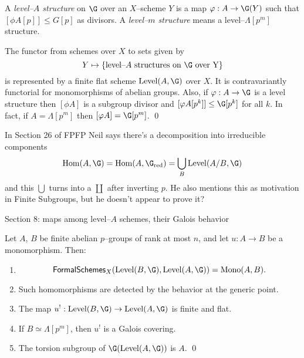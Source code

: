 \begin{definition}
A \textit{level--$A$ structure} on $\G$ over an $X$--scheme $Y$ is a map $\phi: A \to \G(Y)$ such that $[\phi A[p]] \le G[p]$ as divisors.  A \textit{level--$m$ structure} means a level--$\Lambda[p^m]$ structure.
\end{definition}

\begin{lemma}
The functor from schemes over $X$ to sets given by \[Y \mapsto \{\text{level--$A$ structures on $\G$ over Y}\}\] is represented by a finite flat scheme $\Level(A, \G)$ over $X$.  It is contravariantly functorial for monomorphisms of abelian groups.  Also, if $\phi: A \to \G$ is a level structure then $[\phi A]$ is a subgroup divisor and $[\phi A[p^k]] \le \G[p^k]$ for all $k$.  In fact, if $A = \Lambda[p^m]$ then $[\phi A] = \G[p^m]$.  \qed  {}
\end{lemma}

In Section 26 of FPFP Neil says there's a decomposition into irreducible components \[\operatorname{Hom}(A, \G) = \operatorname{Hom}(A, \G_{\mathrm{red}}) = \bigcup_B \Level(A/B, \G)\] and this $\bigcup$ turns into a $\coprod$ after inverting $p$.  He also mentions this as motivation in Finite Subgroups, but he doesn't appear to prove it?

Section 8: maps among level--$A$ schemes, their Galois behavior

\begin{theorem}
Let $A$, $B$ be finite abelian $p$--groups of rank at most $n$, and let $u: A \to B$ be a monomorphism. Then:
\begin{enumerate}
\item \[\CatOf{FormalSchemes}_X(\Level(B, \G), \Level(A, \G)) = \operatorname{Mono}(A, B).\]
\item Such homomorphisms are detected by the behavior at the generic point.
\item The map $u^!: \Level(B, \G) \to \Level(A, \G)$ is finite and flat.
\item If $B \simeq \Lambda[p^m]$, then $u^!$ is a Galois covering.
\item The torsion subgroup of $\G(\Level(A, \G))$ is $A$. \qed
\end{enumerate}
\end{theorem}

